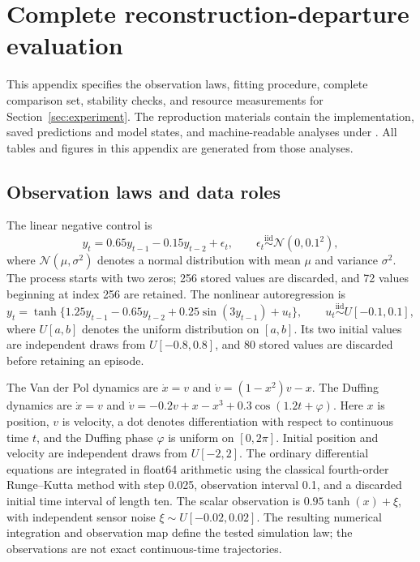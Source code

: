 \section{Complete reconstruction-departure evaluation}
\label{app:reconstruction-results}

This appendix specifies the observation laws, fitting procedure, complete
comparison set, stability checks, and resource measurements for
Section~\ref{sec:experiment}. The reproduction materials
contain the implementation, saved predictions and model states, and
machine-readable analyses under
. All tables and figures in
this appendix are generated from those analyses.

\subsection{Observation laws and data roles}

The linear negative control is
\[
 y_t=0.65y_{t-1}-0.15y_{t-2}+\epsilon_t,
 \qquad \epsilon_t\stackrel{\mathrm{iid}}\sim\mathcal N(0,0.1^2),
\]
where $\mathcal N(\mu,\sigma^2)$ denotes a normal distribution with
mean $\mu$ and variance $\sigma^2$. The process starts with two zeros;
256 stored values are discarded, and 72 values beginning at index 256
are retained. The nonlinear autoregression is
\[
 y_t=\tanh\{1.25y_{t-1}-0.65y_{t-2}
             +0.25\sin(3y_{t-1})+u_t\},
 \qquad u_t\stackrel{\mathrm{iid}}\sim U[-0.1,0.1],
\]
where $U[a,b]$ denotes the uniform distribution on $[a,b]$. Its two
initial values are independent draws from $U[-0.8,0.8]$, and 80 stored
values are discarded before retaining an episode.

The Van der Pol dynamics are $\dot x=v$ and
$\dot v=(1-x^2)v-x$. The Duffing dynamics are $\dot x=v$ and
$\dot v=-0.2v+x-x^3+0.3\cos(1.2t+\varphi)$. Here $x$ is position,
$v$ is velocity, a dot denotes differentiation with respect to continuous
time $t$, and the Duffing phase $\varphi$ is uniform on $[0,2\pi]$.
Initial position and velocity are independent draws from $U[-2,2]$.
The ordinary differential equations are integrated in float64 arithmetic
using the classical fourth-order Runge--Kutta method with step 0.025,
observation interval 0.1, and a discarded initial time interval of length
ten. The scalar observation is $0.95\tanh(x)+\xi$, with independent
sensor noise $\xi\sim U[-0.02,0.02]$. The resulting numerical
integration and observation map define the tested simulation law; the
observations are not exact continuous-time trajectories.

